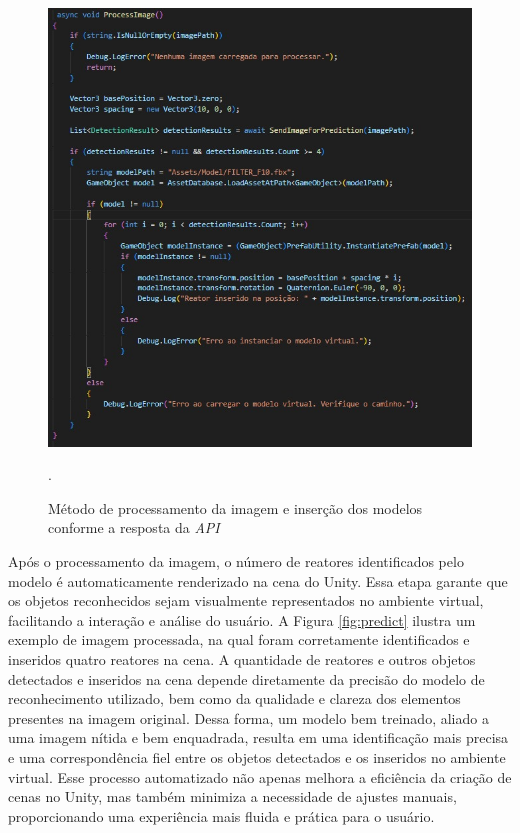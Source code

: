 \begin{figure}[!h]
    \centering
    \begin{minipage}{0.7\linewidth}
    \centering
    \captionsetup{justification=centering,margin=0.5cm,font=small}
    \includegraphics[width=1\linewidth]{img/cap5/process-image.jpeg}
    \caption{Método de processamento da imagem e inserção dos modelos conforme a resposta da \textit{API}}.
    \label{fig:metodo-disposicao}
    \end{minipage}
\end{figure}

Após o processamento da imagem, o número de reatores identificados pelo modelo é automaticamente renderizado na cena do Unity. Essa etapa garante que os objetos reconhecidos sejam visualmente representados no ambiente virtual, facilitando a interação e análise do usuário. A Figura \ref{fig:predict} ilustra um exemplo de imagem processada, na qual foram corretamente identificados e inseridos quatro reatores na cena. A quantidade de reatores e outros objetos detectados e inseridos na cena depende diretamente da precisão do modelo de reconhecimento utilizado, bem como da qualidade e clareza dos elementos presentes na imagem original. Dessa forma, um modelo bem treinado, aliado a uma imagem nítida e bem enquadrada, resulta em uma identificação mais precisa e uma correspondência fiel entre os objetos detectados e os inseridos no ambiente virtual. Esse processo automatizado não apenas melhora a eficiência da criação de cenas no Unity, mas também minimiza a necessidade de ajustes manuais, proporcionando uma experiência mais fluida e prática para o usuário.

